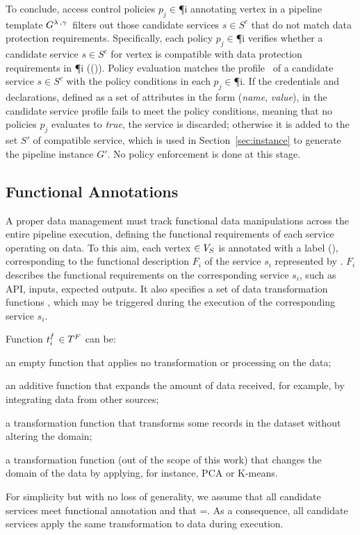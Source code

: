       To conclude, access control policies $p_j$$\in$\P{i} annotating vertex  in a pipeline template $G^{\lambda\,,\gamma\,}$ filters out those candidate services $s$$\in$$S^c$ that do not match data protection requirements. Specifically, each policy $p_j$$\in$\P{i} verifies whether a candidate service $s$$\in$$S^c$ for vertex  is compatible with data protection requirements in \P{i} (\myLambda()). Policy evaluation matches the profile \profile\ of a candidate service $s$$\in$$S^c$ with the policy conditions in each $p_j$$\in$\P{i}. If the credentials and declarations, defined as a set of attributes in the form (\emph{name}, \emph{value}), in the candidate service profile fails to meet the policy conditions, meaning that no policies $p_j$ evaluates to \emph{true}, the service is discarded; otherwise it is added to the set $S'$ of compatible service, which is used in Section~\ref{sec:instance} to generate the pipeline instance $G'$. No policy enforcement is done at this stage.

    \subsection{Functional Annotations}\label{sec:funcannotation}
    A proper data management must track functional data manipulations across the entire pipeline execution, defining the functional requirements of each service operating on data.
    To this aim, each vertex $\in V_S$ is annotated with a label \myGamma(), corresponding to the functional description $F_i$ of the service $s_i$ represented by .
    $F_i$ describes the functional requirements on the corresponding service $s_i$, such as API, inputs, expected outputs.
    It also specifies a set \TF{} of data transformation functions , which may be triggered during the execution of the corresponding service $s_i$.

    Function $t^f_{i}$$\in$$T^F_{}$ can be:
    \begin{enumerate*}[label=\textit{\roman*})]
      \item an empty function \tf{\epsilon} that applies no transformation or processing on the data;
      \item an additive function  that expands the amount of data received, for example, by integrating data from other sources;
      \item a transformation function  that transforms some records in the dataset without altering the domain;
      \item a transformation function  (out of the scope of this work) that changes the domain of the data by applying, for instance, PCA or K-means.
\end{enumerate*}

For simplicity but with no loss of generality, we assume that all candidate services meet functional annotation \F{} and that \TF{}=\tf{}. As a consequence, all candidate services apply the same transformation to data during execution.

